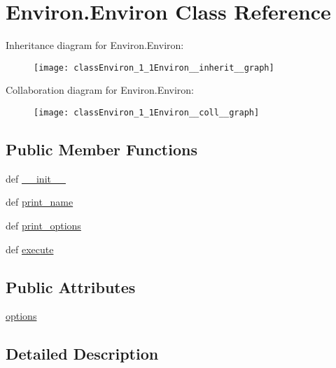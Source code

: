 \hypertarget{classEnviron_1_1Environ}{\section{Environ.\-Environ Class Reference}
\label{classEnviron_1_1Environ}
}


Inheritance diagram for Environ.\-Environ\-:\nopagebreak
\begin{figure}[H]
\begin{center}
\leavevmode
\texttt{[image: classEnviron\_1\_1Environ\_\_inherit\_\_graph]}
\end{center}
\end{figure}


Collaboration diagram for Environ.\-Environ\-:\nopagebreak
\begin{figure}[H]
\begin{center}
\leavevmode
\texttt{[image: classEnviron\_1\_1Environ\_\_coll\_\_graph]}
\end{center}
\end{figure}
\subsection*{Public Member Functions}
\begin{DoxyCompactItemize}
\item 
def \hyperlink{classEnviron_1_1Environ_a298b6da7e53ae9d91fb2d2e6cba89a99}{\-\_\-\-\_\-init\-\_\-\-\_\-}
\item 
def \hyperlink{classEnviron_1_1Environ_a2a24fc03046a5b025df86c5ae1dc69ba}{print\-\_\-name}
\item 
def \hyperlink{classEnviron_1_1Environ_a91417cf853ffd5ef54e8b929a53c44ad}{print\-\_\-options}
\item 
def \hyperlink{classEnviron_1_1Environ_a1f0a93524611bcd9958a6995970eb2dc}{execute}
\end{DoxyCompactItemize}
\subsection*{Public Attributes}
\begin{DoxyCompactItemize}
\item 
\hyperlink{classEnviron_1_1Environ_a9e1a6482623e5f36b1de334c27df5011}{options}
\end{DoxyCompactItemize}


\subsection{Detailed Description}


